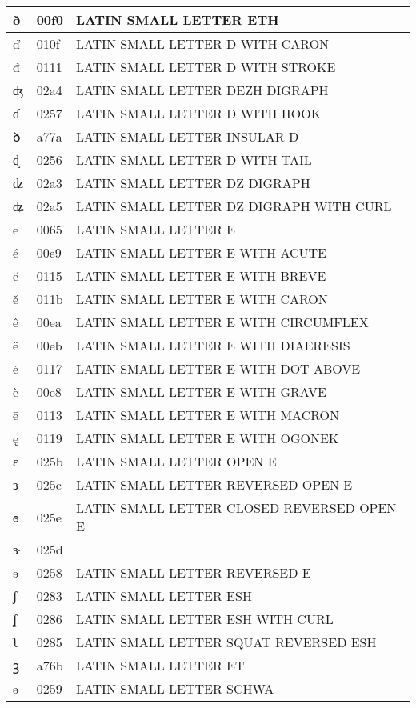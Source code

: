 \documentclass[12pt,letterpaper,openany]{book}
\begin{document}
\begin{center}
\begin{supertabular}{|m{0.25in}|m{0.5in}|m{4in}|}
ð & 00f0 & LATIN SMALL LETTER ETH\\\hline
ď & 010f & LATIN SMALL LETTER D WITH CARON\\\hline
đ & 0111 & LATIN SMALL LETTER D WITH STROKE\\\hline
ʤ & 02a4 & LATIN SMALL LETTER DEZH DIGRAPH\\\hline
ɗ & 0257 & LATIN SMALL LETTER D WITH HOOK\\\hline
ꝺ & a77a & LATIN SMALL LETTER INSULAR D\\\hline
ɖ & 0256 & LATIN SMALL LETTER D WITH TAIL\\\hline
ʣ & 02a3 & LATIN SMALL LETTER DZ DIGRAPH\\\hline
ʥ & 02a5 & LATIN SMALL LETTER DZ DIGRAPH WITH CURL\\\hline
e & 0065 & LATIN SMALL LETTER E\\\hline
é & 00e9 & LATIN SMALL LETTER E WITH ACUTE\\\hline
ĕ & 0115 & LATIN SMALL LETTER E WITH BREVE\\\hline
ě & 011b & LATIN SMALL LETTER E WITH CARON\\\hline
ê & 00ea & LATIN SMALL LETTER E WITH CIRCUMFLEX\\\hline
ë & 00eb & LATIN SMALL LETTER E WITH DIAERESIS\\\hline
ė & 0117 & LATIN SMALL LETTER E WITH DOT ABOVE\\\hline
è & 00e8 & LATIN SMALL LETTER E WITH GRAVE\\\hline
ē & 0113 & LATIN SMALL LETTER E WITH MACRON\\\hline
ę & 0119 & LATIN SMALL LETTER E WITH OGONEK\\\hline
ɛ & 025b & LATIN SMALL LETTER OPEN E\\\hline
ɜ & 025c & LATIN SMALL LETTER REVERSED OPEN E\\\hline
ɞ & 025e & LATIN SMALL LETTER CLOSED REVERSED OPEN E\\\hline
ɝ & 025d & \\\hline
ɘ & 0258 & LATIN SMALL LETTER REVERSED E\\\hline
ʃ & 0283 & LATIN SMALL LETTER ESH\\\hline
ʆ & 0286 & LATIN SMALL LETTER ESH WITH CURL\\\hline
ʅ & 0285 & LATIN SMALL LETTER SQUAT REVERSED ESH\\\hline
ꝫ & a76b & LATIN SMALL LETTER ET\\\hline
ə & 0259 & LATIN SMALL LETTER SCHWA\\\hline

\end{supertabular}
\end{center}
\end{document}
